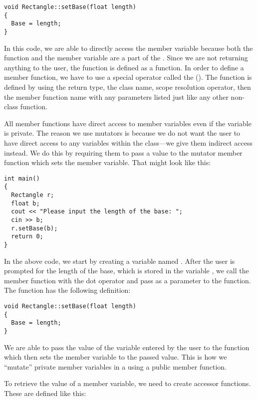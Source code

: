 \begin{lstlisting}
void Rectangle::setBase(float length)
{
  Base = length;
}
\end{lstlisting}

In this code, we are able to directly access the member variable  because both the function  and the member variable  are a part of the . 
Since we are not returning anything to the user, the function is defined as a  function. 
In order to define a member function, we have to use a special operator called the  (\Code{::}). 
The function is defined by using the return type, the class name, scope resolution operator, then the member function name with any parameters listed just like any other non-class function.	


All member functions have direct access to member variables even if the variable is private. 
The reason we use mutators is because we do not want the user to have direct access to any variables within the class---we give them indirect access instead. 
We do this by requiring them to pass a value to the mutator member function which sets the member variable. 
That might look like this: 

\begin{lstlisting}
int main()
{
  Rectangle r;
  float b;
  cout << "Please input the length of the base: ";
  cin >> b;
  r.setBase(b);
  return 0;
}
\end{lstlisting}

In the above code, we start by creating a  variable named . 
After the user is prompted for the length of the base, which is stored in the variable , we call the  member function with the dot operator and pass  as a parameter to the function. 
The  function has the following definition:

\begin{lstlisting}
void Rectangle::setBase(float length)
{
  Base = length;
}
\end{lstlisting}

We are able to pass the value of the variable entered by the user to the  function which then sets the member variable  to the passed value. 
This is how we ``mutate'' private member variables in a  using a public member function. 

To retrieve the value of a member variable, we need to create accessor functions. 
These are defined like this: 

